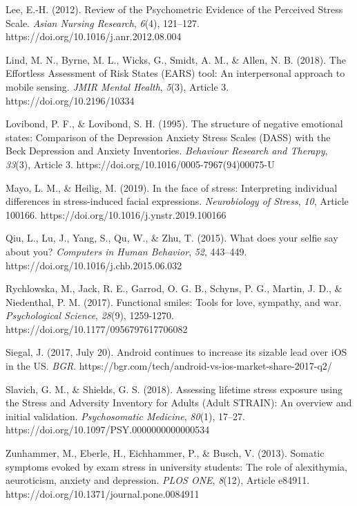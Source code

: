 \documentclass[authordate, empirical,issue]{jote-new-article}
\begin{document}
Lee, E.-H. (2012). Review of the Psychometric Evidence of the Perceived Stress Scale. \emph{Asian Nursing Research}, \emph{6}(4), 121--127. https://doi.org/10.1016/j.anr.2012.08.004

\balance

Lind, M. N., Byrne, M. L., Wicks, G., Smidt, A. M., \& Allen, N. B. (2018). The Effortless Assessment of Risk States (EARS) tool: An interpersonal approach to mobile sensing. \emph{JMIR Mental Health}, \emph{5}(3), Article 3. https://doi.org/10.2196/10334



Lovibond, P. F., \& Lovibond, S. H. (1995). The structure of negative emotional states: Comparison of the Depression Anxiety Stress Scales (DASS) with the Beck Depression and Anxiety Inventories. \emph{Behaviour Research and Therapy}, \emph{33}(3), Article 3. https://doi.org/10.1016/0005-7967(94)00075-U



Mayo, L. M., \& Heilig, M. (2019). In the face of stress: Interpreting individual differences in stress-induced facial expressions. \emph{Neurobiology of Stress}, \emph{10}, Article 100166. https://doi.org/10.1016/j.ynstr.2019.100166



Qiu, L., Lu, J., Yang, S., Qu, W., \& Zhu, T. (2015). What does your selfie say about you? \emph{Computers in Human Behavior}, \emph{52}, 443--449. https://doi.org/10.1016/j.chb.2015.06.032



Rychlowska, M., Jack, R. E., Garrod, O. G. B., Schyns, P. G., Martin, J. D., \& Niedenthal, P. M. (2017). Functional smiles: Tools for love, sympathy, and war. \emph{Psychological Science}, \emph{28}(9), 1259-1270. https://doi.org/10.1177/0956797617706082



Siegal, J. (2017, July 20). Android continues to increase its sizable lead over iOS in the US. \emph{BGR}. https://bgr.com/tech/android-vs-ios-market-share-2017-q2/



Slavich, G. M., \& Shields, G. S. (2018). Assessing lifetime stress exposure using the Stress and Adversity Inventory for Adults (Adult STRAIN): An overview and initial validation. \emph{Psychosomatic Medicine}, \emph{80}(1), 17--27. https://doi.org/10.1097/PSY.0000000000000534



Zunhammer, M., Eberle, H., Eichhammer, P., \& Busch, V. (2013). Somatic symptoms evoked by exam stress in university students: The role of alexithymia, aeuroticism, anxiety and depression. \emph{PLOS ONE}, \emph{8}(12), Article e84911. https://doi.org/10.1371/journal.pone.0084911
\end{document}
